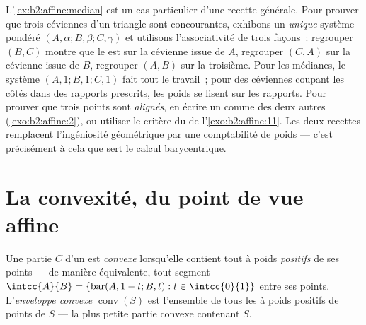 \begin{remark}
L'\cref{ex:b2:affine:median} est un cas particulier d'une recette
générale. Pour prouver que trois céviennes d'un triangle sont
concourantes, exhibons un \emph{unique} système pondéré $(A,
\alpha; B, \beta; C, \gamma)$ et utilisons l'associativité de trois
façons~: regrouper $(B, C)$ montre que le  est sur la
cévienne issue de $A$, regrouper $(C, A)$ sur la cévienne issue de $B$,
regrouper $(A, B)$ sur la troisième. Pour les médianes, le système
$(A, 1; B, 1; C, 1)$ fait tout le travail~; pour des céviennes coupant
les côtés dans des rapports prescrits, les poids se lisent sur les
rapports. Pour prouver que trois points sont \emph{alignés}, en écrire
un comme  des deux autres (\cref{exo:b2:affine:2}), ou
utiliser le critère du  de l'\cref{exo:b2:affine:11}. Les
deux recettes remplacent l'ingéniosité géométrique par une comptabilité
de poids --- c'est précisément à cela que sert le calcul barycentrique.
\end{remark}

\section{La convexité, du point de vue affine}

\begin{definition}\label{def:b2:affine:convex}
Une partie $C$ d'un  est \emph{convexe} lorsqu'elle contient
tout  à poids \emph{positifs} de ses points ---
de manière équivalente, tout segment $\intcc{A}{B} = \{\operatorname{bar}(A,
1-t; B, t) : t \in \intcc{0}{1}\}$ entre ses points. L'\emph{enveloppe
convexe} $\operatorname{conv}(S)$ est l'ensemble de tous les
 à poids positifs de points de $S$ --- la plus petite
partie convexe contenant $S$.
\end{definition}

